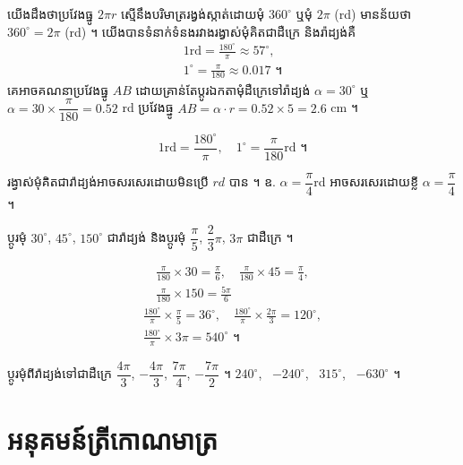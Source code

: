 យើងដឹងថាប្រវែងធ្នូ $2\pi r$ ស្មើនឹងបរិមាត្ររង្វង់ស្កាត់ដោយមុំ $360^\circ$ ឬមុំ $2\pi$ (rd) មានន័យថា $360^\circ = 2\pi$ (rd) ។ យើងបានទំនាក់ទំនងរវាងរង្វាស់មុំគិតជាដឺក្រេ និងរ៉ាដ្យង់គឺ
\[
\begin{gathered}
1\text{rd} = \frac{180^\circ}{\pi} \approx 57^\circ,\\
1^\circ = \frac{\pi}{180} \approx 0.017 \text{ ។}
\end{gathered}
\]
គេអាចគណនាប្រវែងធ្នូ $AB$ ដោយគ្រាន់តែប្តូរឯកតាមុំដឺក្រេទៅរ៉ាដ្យង់ $\alpha = 30^\circ$ ឬ $\alpha = 30 \times \dfrac{\pi}{180} = 0.52$ rd ប្រវែងធ្នូ $AB = \alpha \cdot r = 0.52 \times 5 = 2.6$ cm ។

\begin{formulaBox}[ជាទូទៅ]
\[ 1\text{rd} = \frac{180^\circ}{\pi}, \quad 1^\circ = \frac{\pi}{180}\text{rd} \text{ ។} \]
\end{formulaBox}

\begin{note}[សម្គាល់]
រង្វាស់មុំគិតជារ៉ាដ្យង់អាចសរសេរដោយមិនប្រើ $rd$ បាន ។ ឧ. $\alpha = \dfrac{\pi}{4}$rd អាចសរសេរដោយខ្លី $\alpha = \dfrac{\pi}{4}$ ។
\end{note}

\begin{example}[លំហាត់គំរូ ៣]
ប្តូរមុំ $30^\circ$, $45^\circ$, $150^\circ$ ជារ៉ាដ្យង់ និងប្តូរមុំ $\dfrac{\pi}{5}$, $\dfrac{2}{3}\pi$, $3\pi$ ជាដឺក្រេ ។
\end{example}
\ans
\[
\begin{gathered}
\frac{\pi}{180} \times 30 = \frac{\pi}{6}, \quad \frac{\pi}{180} \times 45 = \frac{\pi}{4},\\
\frac{\pi}{180} \times 150 = \frac{5\pi}{6}
\end{gathered}
\]
\[
\begin{gathered}
\frac{180^\circ}{\pi} \times \frac{\pi}{5} = 36^\circ, \quad \frac{180^\circ}{\pi} \times \frac{2\pi}{3} = 120^\circ,\\
\frac{180^\circ}{\pi} \times 3\pi = 540^\circ \text{ ។}
\end{gathered}
\]

\begin{pro}
ប្តូរមុំពីរ៉ាដ្យង់ទៅជាដឺក្រេ $\dfrac{4\pi}{3}$, $-\dfrac{4\pi}{3}$, $\dfrac{7\pi}{4}$, $-\dfrac{7\pi}{2}$ ។
\ans
$240^\circ$, \ $-240^\circ$, \ $315^\circ$, \ $-630^\circ$ ។
\end{pro}

\section{អនុគមន៍ត្រីកោណមាត្រ}

